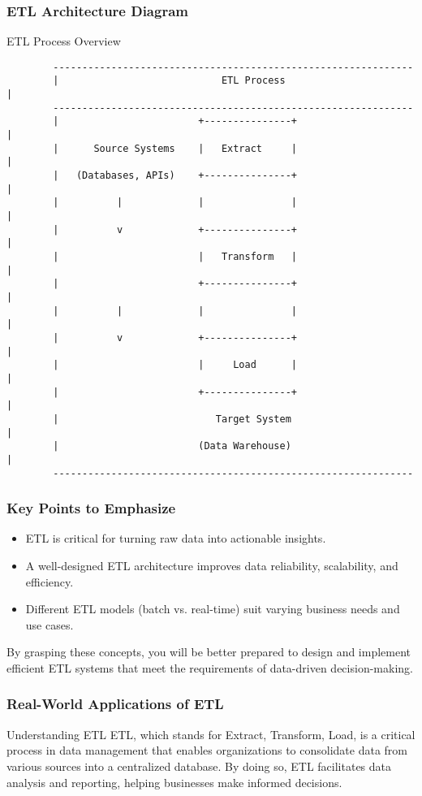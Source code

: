 \documentclass[aspectratio=169]{beamer}
\begin{document}
\begin{frame}[fragile]
    \frametitle{ETL Architecture Diagram}
    \begin{block}{ETL Process Overview}
        \begin{verbatim}
        --------------------------------------------------------------
        |                            ETL Process                       |
        --------------------------------------------------------------
        |                        +---------------+                    |
        |      Source Systems    |   Extract     |                    |
        |   (Databases, APIs)    +---------------+                    |
        |          |             |               |                    |
        |          v             +---------------+                    |
        |                        |   Transform   |                    |
        |                        +---------------+                    |
        |          |             |               |                    |
        |          v             +---------------+                    |
        |                        |     Load      |                    |
        |                        +---------------+                    |
        |                           Target System                       |
        |                        (Data Warehouse)                      |
        --------------------------------------------------------------
        \end{verbatim}
    \end{block}
\end{frame}

\begin{frame}[fragile]
    \frametitle{Key Points to Emphasize}
    \begin{itemize}
        \item ETL is critical for turning raw data into actionable insights.
        \item A well-designed ETL architecture improves data reliability, scalability, and efficiency.
        \item Different ETL models (batch vs. real-time) suit varying business needs and use cases.
    \end{itemize}
    By grasping these concepts, you will be better prepared to design and implement efficient ETL systems that meet the requirements of data-driven decision-making.
\end{frame}

\begin{frame}[fragile]
    \frametitle{Real-World Applications of ETL}
    \begin{block}{Understanding ETL}
        ETL, which stands for Extract, Transform, Load, is a critical process in data management that enables organizations to consolidate data from various sources into a centralized database. By doing so, ETL facilitates data analysis and reporting, helping businesses make informed decisions.
    \end{block}
\end{frame}
\end{document}
